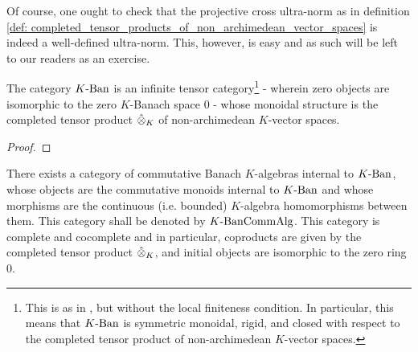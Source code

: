             \begin{remark}
                Of course, one ought to check that the projective cross ultra-norm as in definition \ref{def: completed_tensor_products_of_non_archimedean_vector_spaces} is indeed a well-defined ultra-norm. This, however, is easy and as such will be left to our readers as an exercise.  
            \end{remark}
            \begin{proposition} \label{prop: completed_tensor_products_of_non_archimedean_banach_spaces}
                The category $K\text{-}\mathrm{Ban}$ is an infinite tensor category\footnote{This is as in \cite[Definition 4.1.1]{EGNO}, but without the local finiteness condition. In particular, this means that $K\text{-}\mathrm{Ban}$ is symmetric monoidal, rigid, and closed with respect to the completed tensor product of non-archimedean $K$-vector spaces.} - wherein zero objects are isomorphic to the zero $K$-Banach space $0$ - whose monoidal structure is the completed tensor product $\hattensor_K$ of non-archimedean $K$-vector spaces.
            \end{proposition}
                \begin{proof}
                    
                \end{proof}
            \begin{corollary}
                There exists a category of commutative Banach $K$-algebras internal to $K\text{-}\mathrm{Ban}$, whose objects are the commutative monoids internal to $K\text{-}\mathrm{Ban}$ and whose morphisms are the continuous (i.e. bounded) $K$-algebra homomorphisms between them. This category shall be denoted by $K\text{-}\mathrm{Ban}\mathrm{Comm}\mathrm{Alg}$. This category is complete and cocomplete and in particular, coproducts are given by the completed tensor product $\hattensor_K$, and initial objects are isomorphic to the zero ring $0$.
            \end{corollary}
            
